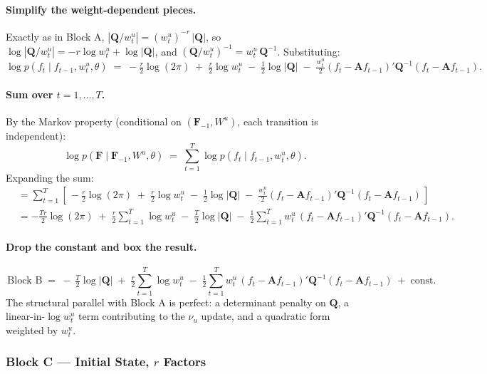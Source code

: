 \documentclass[11pt, a4paper, oneside]{article}
\newcommand{\mF}{\mathbf{F}}
\newcommand{\mA}{\mathbf{A}}
\newcommand{\mQ}{\mathbf{Q}}
\begin{document}
\paragraph{Simplify the weight-dependent pieces.}
Exactly as in Block A, $|\mQ/w^u_t| = (w^u_t)^{-r}\,|\mQ|$, so
$\log|\mQ/w^u_t| = -r \log w^u_t + \log|\mQ|$, and
$(\mQ/w^u_t)^{-1} = w^u_t\,\mQ^{-1}$. Substituting:
\[
\log p(f_t \mid f_{t-1}, w^u_t, \theta)
\;=\; -\tfrac{r}{2}\log(2\pi) \;+\; \tfrac{r}{2}\log w^u_t \;-\; \tfrac{1}{2}\log|\mQ|
\;-\; \tfrac{w^u_t}{2}(f_t - \mA f_{t-1})'\mQ^{-1}(f_t - \mA f_{t-1}).
\]



\paragraph{Sum over $t = 1, \ldots, T$.}
By the Markov property (conditional on $(\mF_{-1}, W^u)$, each transition
is independent):
\[
\log p(\mF \mid \mF_{-1}, W^u, \theta)
\;=\; \sum_{t=1}^{T} \log p(f_t \mid f_{t-1}, w^u_t, \theta).
\]
Expanding the sum:
\begin{align*}
&= \sum_{t=1}^{T} \left[\, -\tfrac{r}{2}\log(2\pi)
\;+\; \tfrac{r}{2}\log w^u_t
\;-\; \tfrac{1}{2}\log|\mQ|
\;-\; \tfrac{w^u_t}{2}(f_t - \mA f_{t-1})'\mQ^{-1}(f_t - \mA f_{t-1}) \,\right] \\[4pt]
&= -\tfrac{Tr}{2}\log(2\pi)
\;+\; \tfrac{r}{2}\sum_{t=1}^{T} \log w^u_t
\;-\; \tfrac{T}{2}\log|\mQ|
\;-\; \tfrac{1}{2}\sum_{t=1}^{T} w^u_t\,(f_t - \mA f_{t-1})'\mQ^{-1}(f_t - \mA f_{t-1}).
\end{align*}

\paragraph{Drop the constant and box the result.}
\begin{equation}
\boxed{\,
\text{Block B} \;=\;
-\,\tfrac{T}{2}\log|\mQ|
\;+\; \tfrac{r}{2}\sum_{t=1}^{T} \log w^u_t
\;-\; \tfrac{1}{2}\sum_{t=1}^{T} w^u_t\, (f_t - \mA f_{t-1})'\mQ^{-1}(f_t - \mA f_{t-1}) \;+\; \text{const}.
\,}
\label{eq:block-B}
\end{equation}
The structural parallel with Block A is perfect: a determinant penalty
on $\mQ$, a linear-in-$\log w^u_t$ term contributing to the $\nu_u$
update, and a quadratic form weighted by $w^u_t$.

\subsubsection*{Block C — Initial State, $r$ Factors}
\end{document}
